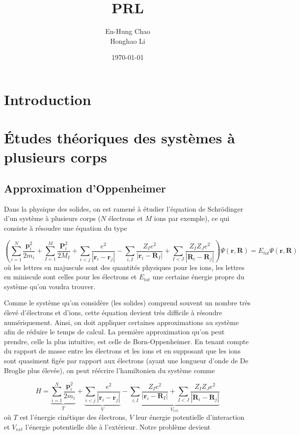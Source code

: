 \documentclass[12pt, french]{report}
\title{PRL}
\author{En-Hung Chao \\ Honghao Li}
\date{\today}
\theoremstyle{theoreme}
\begin{document}
\maketitle

\newpage
\tableofcontents

\newpage
\chapter{Introduction}


\chapter{Études théoriques des systèmes à plusieurs corps}
\section{Approximation d'Oppenheimer}
Dans la physique des solides, on est ramené à étudier l'équation de Schrödinger d'un système à plusieurs corps ($N$ électrons et $M$ ions par exemple), ce qui consiste à résoudre une équation du type

$$
(\sum_{i=1}^N \frac{\textbf{p}_i^2}{2m_i} + \sum_{I=1}^M \frac{\textbf{P}_i^2}{2M_I}
+ \sum_{i<j}\frac{e^2}{| \textbf{r}_i - \textbf{r}_j |} - \sum_{i, I}\frac{Z_I e^2}{| \textbf{r}_i
- \textbf{R}_I |} + \sum_{I<J}\frac{Z_I Z_J e^2}{| \textbf{R}_i - \textbf{R}_j |} ) \Psi(\textbf{r}, \textbf{R}) = E_{tot} \Psi(\textbf{r}, \textbf{R})
$$
où les lettres en majuscule sont des quantités physiques pour les ions, les lettres en miniscule sont celles pour les électrons et $E_{tot}$ une certaine énergie propre du système qu'on voudra trouver.

Comme le système qu'on considère (les solides) comprend souvent un nombre très élevé d'électrons et d'ions, cette équation devient très difficile à résoudre numériquement. Ainsi, on doit appliquer certaines approximations au système afin de réduire le temps de calcul. La première approximation qu'on peut prendre, celle la plus intuitive, est celle de Born-Oppenheimer. En tenant compte du rapport de masse entre les électrons et les ions et en supposant que les ions sont quasiment figés par rapport aux électrons (ayant une longueur d'onde de De Broglie plus élevée), on peut réécrire l'hamiltonien du système comme

$$
H = \underbrace{\sum_{i=1}^N \frac{\textbf{p}_i^2}{2m_i}}_{T}
+ \underbrace{\sum_{i<j}\frac{e^2}{| \textbf{r}_i - \textbf{r}_j |}}_{V}
- \underbrace{\sum_{i, I}\frac{Z_I e^2}{| \textbf{r}_i - \textbf{R}_I |} + \sum_{I<J}\frac{Z_I Z_J e^2}{| \textbf{R}_i - \textbf{R}_j |}}_{V_{ext}}
$$
où $T$ est l'énergie cinétique des électrons, $V$ leur énergie potentielle d'interaction et $V_{ext}$ l'énergie potentielle dûe à l'extérieur.
Notre problème devient
\end{document}
